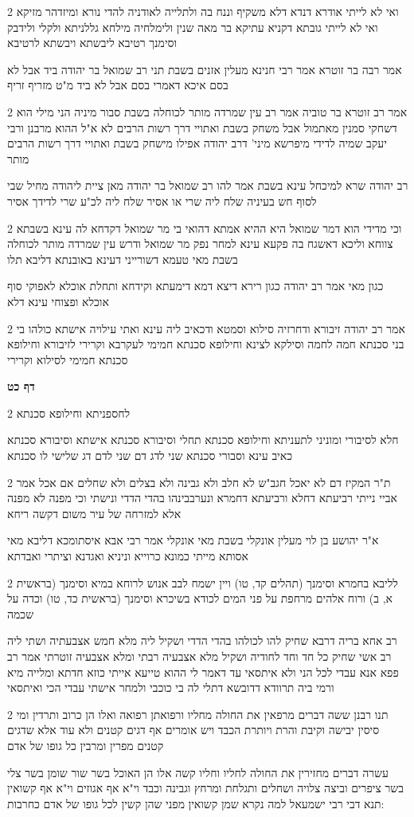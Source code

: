 \documentclass[12pt, openany]{book}
\newcommand{\sethebfont}{
\fontsize{10.5pt}{21.0pt} \selectfont
}
\newcommand{\twocol}[1]{
	{\sethebfont \begin{multicols}{2}
			#1
	\end{multicols}}	
}
\newcommand{\sectname}{}
\newcommand{\newsection}[1]{
	\addcontentsline{toc}{section}{#1}
	\renewcommand{\sectname}{#1}	
	\vspace{-\baselineskip}
	\begin{center}
		\textbf{%
\fontsize{16pt}{16pt}\selectfont
			#1}
	\end{center}
	\vspace{-\baselineskip}
	\nopagebreak
}
\begin{document}
\twocol{ואי לא לייתי אודרא דנדא דלא משקיף וננח בה ולתלייה לאודניה להדי נורא ומיזדהר מזיקא ואי לא לייתי גובתא דקניא עתיקא בר מאה שנין ולימלחיה מילחא גללניתא ולקלי ולידבק וסימנך רטיבא ליבשתא ויבשתא לרטיבא
\par אמר רבה בר זוטרא אמר רבי חנינא מעלין אזנים בשבת תני רב שמואל בר יהודה ביד אבל לא בסם איכא דאמרי בסם אבל לא ביד מ"ט מזריף זריף}
\twocol{אמר רב זוטרא בר טוביה אמר רב עין שמרדה מותר לכוחלה בשבת סבור מיניה הני מילי הוא דשחקי סמנין מאתמול אבל משחק בשבת ואתויי דרך רשות הרבים לא א"ל ההוא מרבנן ורבי יעקב שמיה לדידי מיפרשא מיני' דרב יהודה אפילו מישחק בשבת ואתויי דרך רשות הרבים מותר
\par רב יהודה שרא למיכחל עינא בשבת אמר להו רב שמואל בר יהודה מאן ציית ליהודה מחיל שבי לסוף חש בעיניה שלח ליה שרי או אסיר שלח ליה לכ"ע שרי לדידך אסיר}
\twocol{וכי מדידי הוא דמר שמואל היא ההיא אמתא דהואי בי מר שמואל דקדחא לה עינא בשבתא צווחא וליכא דאשגח בה פקעא עינא למחר נפק מר שמואל ודרש עין שמרדה מותר לכוחלה בשבת מאי טעמא דשורייני דעינא באובנתא דליבא תלו
\par כגון מאי אמר רב יהודה כגון רירא דיצא דמא דימעתא וקידחא ותחלת אוכלא לאפוקי סוף אוכלא ופצוחי עינא דלא}
\twocol{אמר רב יהודה זיבורא ודחרזיה סילוא וסמטא ודכאיב ליה עינא ואתי עילויה אישתא כולהו בי בני סכנתא חמה לחמה וסילקא לצינא וחילופא סכנתא חמימי לעקרבא וקרירי לזיבורא וחילופא סכנתא חמימי לסילוא וקרירי}
\newsection{דף כט}
\twocol{לחספניתא וחילופא סכנתא
\par חלא לסיבורי ומוניני לתעניתא וחילופא סכנתא תחלי וסיבורא סכנתא אישתא וסיבורא סכנתא כאיב עינא וסבורי סכנתא שני לדג דם שני לדם דג שלישי לו סכנתא}
\twocol{ת"ר המקיז דם לא יאכל חגב"ש לא חלב ולא גבינה ולא בצלים ולא שחלים אם אכל אמר אביי נייתי רביעתא דחלא ורביעתא דחמרא ונערבבינהו בהדי הדדי ונישתי וכי מפנה לא מפנה אלא למזרחה של עיר משום דקשה ריחא
\par א"ר יהושע בן לוי מעלין אונקלי בשבת מאי אונקלי אמר רבי אבא איסתומכא דליבא מאי אסותא מייתי כמונא כרוייא וניניא ואגדנא וציתרי ואבדתא}
\twocol{לליבא בחמרא וסימנך (תהלים קד, טו) ויין ישמח לבב אנוש לרוחא במיא וסימנך (בראשית א, ב) ורוח אלהים מרחפת על פני המים לכודא בשיכרא וסימנך (בראשית כד, טו) וכדה על שכמה
\par רב אחא בריה דרבא שחיק להו לכולהו בהדי הדדי ושקיל ליה מלא חמש אצבעתיה ושתי ליה רב אשי שחיק כל חד וחד לחודיה ושקיל מלא אצבעיה רבתי ומלא אצבעיה זוטרתי אמר רב פפא אנא עבדי לכל הני ולא איתסאי עד דאמר לי ההוא טייעא אייתי כוזא חדתא ומלייה מיא ורמי ביה תרוודא דדובשא דתלי לה בי כוכבי ולמחר אישתי עבדי הכי ואיתסאי}
\twocol{תנו רבנן ששה דברים מרפאין את החולה מחליו ורפואתן רפואה ואלו הן כרוב ותרדין ומי סיסין יבישה וקיבת והרת ויותרת הכבד ויש אומרים אף דגים קטנים ולא עוד אלא שדגים קטנים מפרין ומרבין כל גופו של אדם
\par עשרה דברים מחזירין את החולה לחליו וחליו קשה אלו הן האוכל בשר שור שומן בשר צלי בשר ציפרים וביצה צלויה ושחלים ותגלחת ומרחץ וגבינה וכבד וי"א אף אגוזים וי"א אף קשואין תנא דבי רבי ישמעאל למה נקרא שמן קשואין מפני שהן קשין לכל גופו של אדם כחרבות:}
\end{document}
